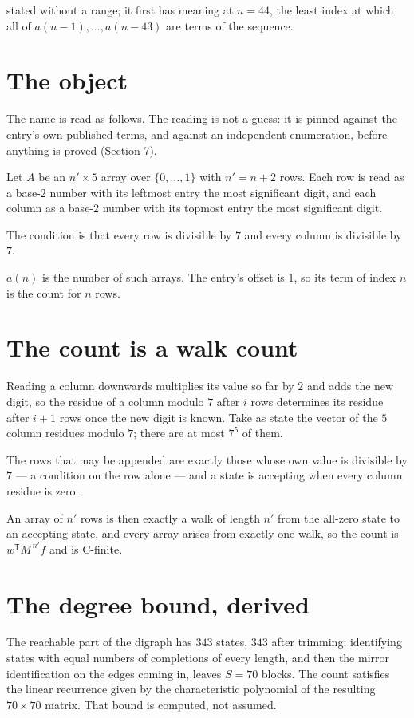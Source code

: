\documentclass[11pt]{article}
\theoremstyle{definition}
\begin{document}
stated without a range; it first has meaning at $n = 44$, the least index at which all of $a(n-1),\dots,a(n-43)$ are terms of the sequence.

\section{The object}

The name is read as follows. The reading is not a guess: it is pinned against the entry's own published terms, and against an independent enumeration, before anything is proved (Section 7).

Let $A$ be an $n' \times 5$ array over $\{0,\dots,1\}$ with $n' = n + 2$ rows. Each row is read as a base-$2$ number with its leftmost entry the most significant digit, and each column as a base-$2$ number with its topmost entry the most significant digit.

The condition is that every row is divisible by $7$ and every column is divisible by $7$.

$a(n)$ is the number of such arrays. The entry's offset is 1, so its term of index $n$ is the count for $n$ rows.

\section{The count is a walk count}

Reading a column downwards multiplies its value so far by $2$ and adds the new digit, so the residue of a column modulo $7$ after $i$ rows determines its residue after $i+1$ rows once the new digit is known. Take as state the vector of the $5$ column residues modulo $7$; there are at most $7^{5}$ of them.

The rows that may be appended are exactly those whose own value is divisible by $7$ --- a condition on the row alone --- and a state is accepting when every column residue is zero.

An array of $n'$ rows is then exactly a walk of length $n'$ from the all-zero state to an accepting state, and every array arises from exactly one walk, so the count is $w^{\mathsf T}M^{\,n'}f$ and is C-finite.

\section{The degree bound, derived}

The reachable part of the digraph has $343$ states, $343$ after trimming; identifying states with equal numbers of completions of every length, and then the mirror identification on the edges coming in, leaves $S = 70$ blocks. The count satisfies the linear recurrence given by the characteristic polynomial of the resulting $70\times70$ matrix. That bound is computed, not assumed.
\end{document}
